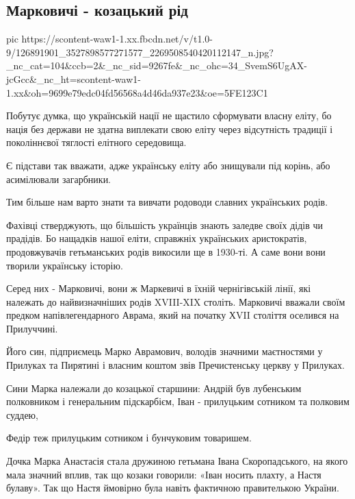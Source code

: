  
 
 

\subsection{Марковичі - козацький рід}

\ifcmt
pic https://scontent-waw1-1.xx.fbcdn.net/v/t1.0-9/126891901_3527898577271577_2269508540420112147_n.jpg?_nc_cat=104&ccb=2&_nc_sid=9267fe&_nc_ohc=34_SvemS6UgAX-jcGcc&_nc_ht=scontent-waw1-1.xx&oh=9699e79edc04fd56568a4d46da937e23&oe=5FE123C1
\fi

Побутує думка, що українській нації не щастило сформувати власну еліту, бо
нація без держави не здатна виплекати свою еліту через відсутність традиції і
поколіннєвої тяглості елітного середовища. 

Є підстави так вважати, адже українську еліту або знищували під корінь, або
асимілювали загарбники.

Тим більше нам варто знати та вивчати родоводи славних українських родів.

Фахівці стверджують, що більшість українців знають заледве своїх дідів чи
прадідів. Бо нащадків нашої еліти, справжніх українських аристократів,
продовжувачів гетьманських родів викосили ще в 1930-ті. А саме вони вони
творили українську історію.

Серед них - Марковичі, вони ж Маркевичі в їхній чернігівській лінії, які
належать до найвизначніших родів XVIII-XIX століть.  Марковичі вважали своїм
предком напівлегендарного Аврама, який на початку ХVII століття оселився на
Прилуччині.

Його син, підприємець Марко Аврамович, володів значними маєтностями у Прилуках
та Пирятині і власним коштом звів Пречистенську церкву у Прилуках.

Сини Марка належали до козацької старшини: Андрій був лубенським полковником і
генеральним підскарбієм, Іван - прилуцьким сотником та полковим суддею, 

Федір теж прилуцьким сотником і бунчуковим товаришем.

Дочка Марка Анастасія стала дружиною гетьмана Івана Скоропадського, на якого
мала значний вплив, так що козаки говорили: «Іван носить плахту, а Настя
булаву». Так що Настя ймовірно була навіть фактичною правителькою України. 

